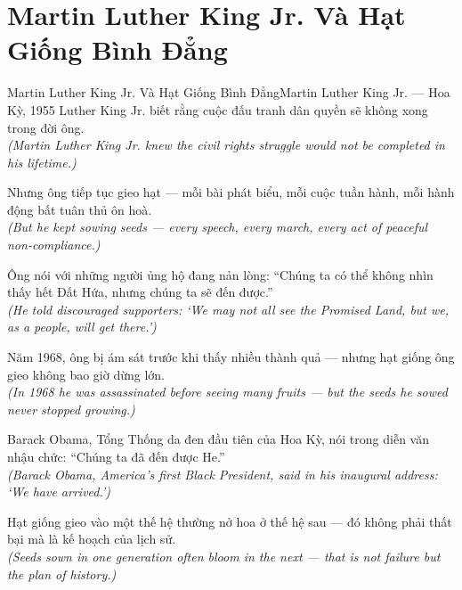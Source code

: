 \section{Martin Luther King Jr. Và Hạt Giống Bình Đẳng}
\begin{truyen}{Martin Luther King Jr. Và Hạt Giống Bình Đẳng}{Martin Luther King Jr. --- Hoa Kỳ, 1955}
 Luther King Jr. biết rằng cuộc đấu tranh dân quyền sẽ không xong trong đời ông.\\[4pt]
\textit{(Martin Luther King Jr. knew the civil rights struggle would not be completed in his lifetime.)}

Nhưng ông tiếp tục gieo hạt --- mỗi bài phát biểu, mỗi cuộc tuần hành, mỗi hành động bất tuân thủ ôn hoà.\\[4pt]
\textit{(But he kept sowing seeds --- every speech, every march, every act of peaceful non-compliance.)}

Ông nói với những người ủng hộ đang nản lòng: ``Chúng ta có thể không nhìn thấy hết Đất Hứa, nhưng chúng ta sẽ đến được.''\\[4pt]
\textit{(He told discouraged supporters: `We may not all see the Promised Land, but we, as a people, will get there.')}

Năm 1968, ông bị ám sát trước khi thấy nhiều thành quả --- nhưng hạt giống ông gieo không bao giờ dừng lớn.\\[4pt]
\textit{(In 1968 he was assassinated before seeing many fruits --- but the seeds he sowed never stopped growing.)}

Barack Obama, Tổng Thống da đen đầu tiên của Hoa Kỳ, nói trong diễn văn nhậu chức: ``Chúng ta đã đến được He.''\\[4pt]
\textit{(Barack Obama, America's first Black President, said in his inaugural address: `We have arrived.')}

\end{truyen}
\begin{baihoc}
  Hạt giống gieo vào một thế hệ thường nở hoa ở thế hệ sau --- đó không phải thất bại mà là kế hoạch của lịch sử.\\[4pt]
  \textit{(Seeds sown in one generation often bloom in the next --- that is not failure but the plan of history.)}
\end{baihoc}

